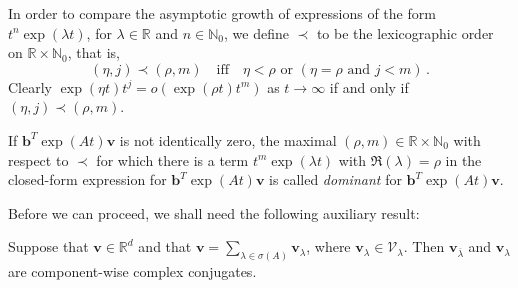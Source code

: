 
In order to compare the asymptotic growth of expressions of the form
$t^{n}\exp(\lambda t)$, for $\lambda\in\mathbb{R}$ and
$n\in\mathbb{N}_0$, we define $\prec$ to be the lexicographic order on
$\mathbb{R}\times\mathbb{N}_{0}$, that is,
\begin{equation*}
(\eta,j)\prec (\rho,m) \quad \mbox{iff} \quad
\eta<\rho \mbox{ or } (\eta = \rho \mbox{ and } j< m) \, .
\end{equation*}
Clearly $\exp(\eta t)t^{j}=o(\exp(\rho t)t^{m})$ as $t\rightarrow \infty$ if and only if $(\eta,j)\prec (\rho,m)$.

\begin{definition}
If $\boldsymbol{b}^{T}\exp(At)\boldsymbol{v}$ is not identically zero,
the maximal $(\rho,m)\in\mathbb{R}\times\mathbb{N}_{0}$ with respect
to $\prec$ for which there is a term $t^{m}\exp (\lambda t)$ with
$\Re(\lambda)=\rho$ in the closed-form expression for
$\boldsymbol{b}^{T}\exp(At)\boldsymbol{v}$ is called \emph{dominant} for
$\boldsymbol{b}^{T}\exp(At)\boldsymbol{v}$.
\end{definition}

Before we can proceed, we shall need the following auxiliary result:

\begin{proposition}
\label{conj-relation}
Suppose that $\boldsymbol{v}\in\mathbb{R}^{d}$ and that $\boldsymbol{v}=\sum\limits_{\lambda\in\sigma(A)} \boldsymbol{v}_{\lambda}$, where $\boldsymbol{v}_{\lambda} \in\mathcal{V}_{\lambda}$. Then $\boldsymbol{v}_{\overline{\lambda}}$ and $\boldsymbol{v}_{\lambda}$ are component-wise complex conjugates.
\end{proposition}

